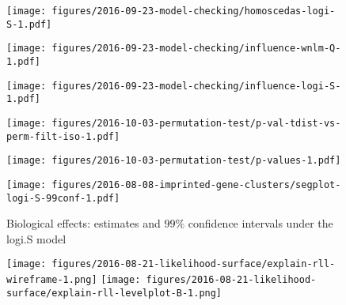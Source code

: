 \documentclass[letterpaper]{article}
\begin{document}
\begin{figure}
\begin{center}
\texttt{[image: figures/2016-09-23-model-checking/homoscedas-logi-S-1.pdf]}
\end{center}
\caption{}
\label{fig:homoscedas-logi.S}
\end{figure}

\begin{figure}
\begin{center}
\texttt{[image: figures/2016-09-23-model-checking/influence-wnlm-Q-1.pdf]}
\end{center}
\caption{}
\label{fig:influence-wnlm.Q}
\end{figure}

\begin{figure}
\begin{center}
\texttt{[image: figures/2016-09-23-model-checking/influence-logi-S-1.pdf]}
\end{center}
\caption{}
\label{fig:influence-logi.S}
\end{figure}

\begin{figure}
\begin{center}
\texttt{[image: figures/2016-10-03-permutation-test/p-val-tdist-vs-perm-filt-iso-1.pdf]}
\end{center}
\caption{}
\label{fig:pval-tdist-vs-perm}
\end{figure}

\begin{figure}
\begin{center}
\texttt{[image: figures/2016-10-03-permutation-test/p-values-1.pdf]}
\end{center}
\caption{}
\label{fig:pval}
\end{figure}

\begin{figure}
\begin{center}
\texttt{[image: figures/2016-08-08-imprinted-gene-clusters/segplot-logi-S-99conf-1.pdf]}
\end{center}
\caption{Biological effects: estimates and $99\%$ confidence intervals under
the logi.S model}
\label{fig:biol-effects-logi.S}
\end{figure}

\begin{figure}
\begin{center}
\texttt{[image: figures/2016-08-21-likelihood-surface/explain-rll-wireframe-1.png]}
\texttt{[image: figures/2016-08-21-likelihood-surface/explain-rll-levelplot-B-1.png]}
\end{center}
\caption{}
\label{fig:ll-surf-explain}
\end{figure}
\end{document}
